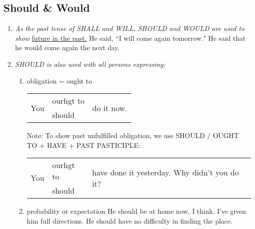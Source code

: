\subsection{Should \& Would}
\begin{enumerate}
    \item {\it As the past tense of SHALL and WILL, SHOULD and WOULD are
        used to show}
        \newline
        \newline
        \underline{future in the past.}
        \newline
        \newline
        He said, ``I will come again tomorrow."
        \newline
        He said that he would come again the next day.
    \item {\it SHOULD is also used with all persons expressing:}
        \begin{enumerate}
            \item obligation = ought to
                \newline
                \newline
                \begin{tabular}{lll}
                    \multirow{2}{*}{You} & ourhgt to & \multirow{2}{*}{do it now.} \\
                    & should &
                \end{tabular}
                \newline
                Note: To show past unfulfilled obligation, we use SHOULD / OUGHT
                TO + HAVE + PAST PASTICIPLE:
                \newline
                \newline
                \begin{tabular}{lll}
                    \multirow{2}{*}{You} & ourhgt to & \multirow{2}{*}{have done it yesterday.
                    Why didn't you do it?} \\
                    & should &
                \end{tabular}
            \item probability or expectation
                \newline
                \newline
                He should be at home now, I think.
                \newline
                I've given him full directions. He should have no difficulty in
                finding the place.

\end{enumerate}
\end{enumerate}

